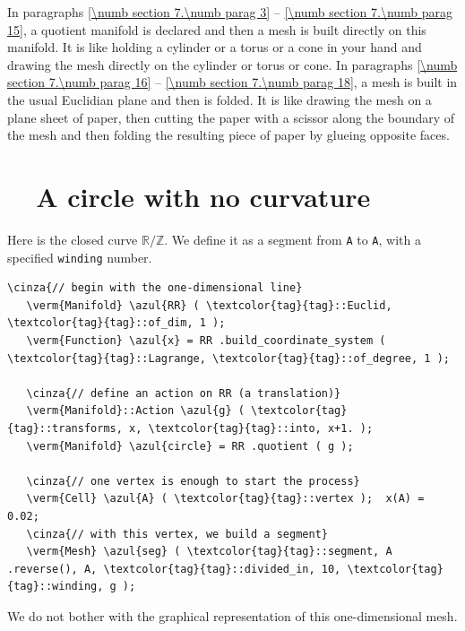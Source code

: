 In paragraphs \ref{\numb section 7.\numb parag 3} -- \ref{\numb section 7.\numb parag 15},
a quotient manifold is declared and then a mesh is built directly on this manifold.
It is like holding a cylinder or a torus or a cone in your hand and drawing the mesh
directly on the cylinder or torus or cone.
In paragraphs \ref{\numb section 7.\numb parag 16} -- \ref{\numb section 7.\numb parag 18},
a mesh is built in the usual Euclidian plane and then is folded.
It is like drawing the mesh on a plane sheet of paper, then cutting the paper with a scissor
along the boundary of the mesh and then folding the resulting piece of paper
by glueing opposite faces.


\section{~~A circle with no curvature}\label{\numb section 7.\numb parag 1}

Here is the closed curve $ \mathbb{R}/{\mathbb Z} $.
We define it as a segment from {\small\tt A} to {\small\tt A}, with a specified
{\small\tt winding} number.

\begin{Verbatim}[commandchars=\\\{\},formatcom=\small\tt,frame=single,
   label=parag-\ref{\numb section 7.\numb parag 1}.cpp,rulecolor=\color{coment},
   baselinestretch=0.94,framesep=2mm                                            ]
   \cinza{// begin with the one-dimensional line}
   \verm{Manifold} \azul{RR} ( \textcolor{tag}{tag}::Euclid, \textcolor{tag}{tag}::of_dim, 1 );
   \verm{Function} \azul{x} = RR .build_coordinate_system ( \textcolor{tag}{tag}::Lagrange, \textcolor{tag}{tag}::of_degree, 1 );

   \cinza{// define an action on RR (a translation)}
   \verm{Manifold}::Action \azul{g} ( \textcolor{tag}{tag}::transforms, x, \textcolor{tag}{tag}::into, x+1. );
   \verm{Manifold} \azul{circle} = RR .quotient ( g );

   \cinza{// one vertex is enough to start the process}
   \verm{Cell} \azul{A} ( \textcolor{tag}{tag}::vertex );  x(A) = 0.02;
   \cinza{// with this vertex, we build a segment}
   \verm{Mesh} \azul{seg} ( \textcolor{tag}{tag}::segment, A .reverse(), A, \textcolor{tag}{tag}::divided_in, 10, \textcolor{tag}{tag}::winding, g );
\end{Verbatim}

We do not bother with the graphical representation of this one-dimensional mesh.

